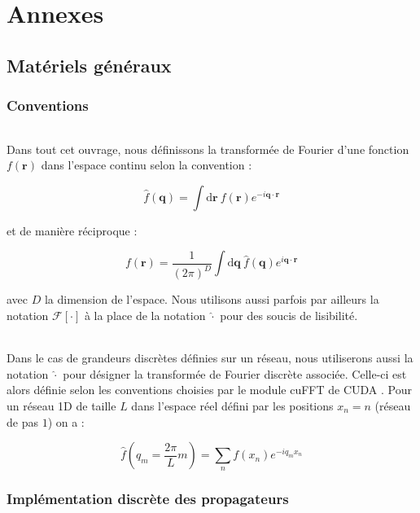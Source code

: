 \chapter*{Annexes}
\label{chapter:annexe}

\setcounter{chapter}{6}
\setcounter{section}{0}

\section{Matériels généraux}

\subsection{Conventions}

\label{sec:conv_fourier}

\subparagraph{}Dans tout cet ouvrage, nous définissons la transformée de Fourier d'une fonction $f(\mathbf{r})$ dans l'espace continu selon la convention :

\begin{equation}
	\hat{f}(\mathbf{q}) = \int \mathrm{d}\mathbf{r}~f(\mathbf{r})e^{-i\mathbf{q}\cdot\mathbf{r}}
\end{equation}

\noindent et de manière réciproque :

\begin{equation}
	f(\mathbf{r}) = \frac{1}{(2\pi)^D}\int \mathrm{d}\mathbf{q}~\hat{f}(\mathbf{q})e^{i\mathbf{q}\cdot\mathbf{r}}
\end{equation}

\noindent avec $D$ la dimension de l'espace. Nous utilisons aussi parfois par ailleurs la notation $\mathcal{F}[\cdot]$ à la place de la notation $\hat{\cdot}$ pour des soucis de lisibilité.

\subparagraph{}Dans le cas de grandeurs discrètes définies sur un réseau, nous utiliserons aussi la notation $\hat{\cdot}$ pour désigner la transformée de Fourier discrète associée. Celle-ci est alors définie selon les conventions choisies par le module cuFFT de CUDA \cite{cuda}. Pour un réseau 1D de taille $L$ dans l'espace réel défini par les positions $x_n = n$ (réseau de pas $1$) on a :

\begin{equation}
	\hat{f}(q_m = \frac{2\pi}{L}m) = \sum_{n} f(x_n)e^{-i q_m x_n}
	\label{eq:TFdisc}
\end{equation}

\subsection{Implémentation discrète des propagateurs}

